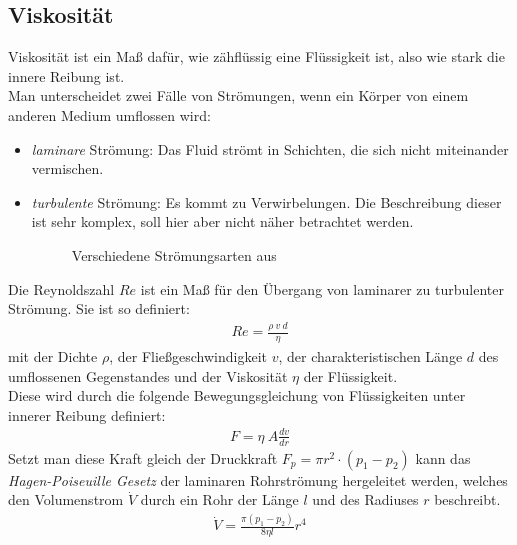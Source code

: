 \documentclass[12pt,a4paper,titlepage,headinclude,bibtotoc]{scrartcl}
\begin{document}
\subsection{Viskosität}
Viskosität ist ein Maß dafür, wie zähflüssig eine Flüssigkeit ist, also wie stark die innere Reibung ist.\\
Man unterscheidet zwei Fälle von Strömungen, wenn ein Körper von einem anderen Medium  umflossen wird:
\begin{itemize}
	\item \textit{laminare} Strömung: Das Fluid strömt in Schichten, die sich nicht miteinander vermischen. %
	\item \textit{turbulente} Strömung: Es kommt zu Verwirbelungen. Die Beschreibung dieser ist sehr komplex, soll hier aber nicht näher betrachtet werden.
\begin{figure}[htb]
  \centering
  \hfill
  \caption{Verschiedene Strömungsarten aus \cite[S. 465]{giancoli}}
  \label{fig:label-gesamt}
\end{figure}
\end{itemize}
Die Reynoldszahl $Re$ ist ein Maß für den Übergang von laminarer zu turbulenter Strömung.
Sie ist so definiert:
\begin{align}
	Re=\frac{\rho~v~d}{\eta}
\end{align}
mit der Dichte $\rho$, der Fließgeschwindigkeit $v$, der charakteristischen Länge $d$ des umflossenen Gegenstandes und der Viskosität $\eta$ der Flüssigkeit.\\
Diese wird durch die folgende Bewegungsgleichung von Flüssigkeiten unter innerer Reibung definiert:
\begin{align}
	F=\eta~ A\frac{dv}{dr}
\end{align}
Setzt man diese Kraft gleich der Druckkraft $F_p=\pi r^2 \cdot (p_1-p_2)$ kann das \textit{Hagen-Poiseuille Gesetz} der laminaren Rohrströmung hergeleitet werden, welches den Volumenstrom $\dot V$ durch ein Rohr der Länge $l$ und des Radiuses $r$ beschreibt.\cite[S.125]{gerthsen} %
\begin{align}
	\dot{V}=\frac{\pi(p_1-p_2)}{8\eta l}r^4
\end{align}
\end{document}
